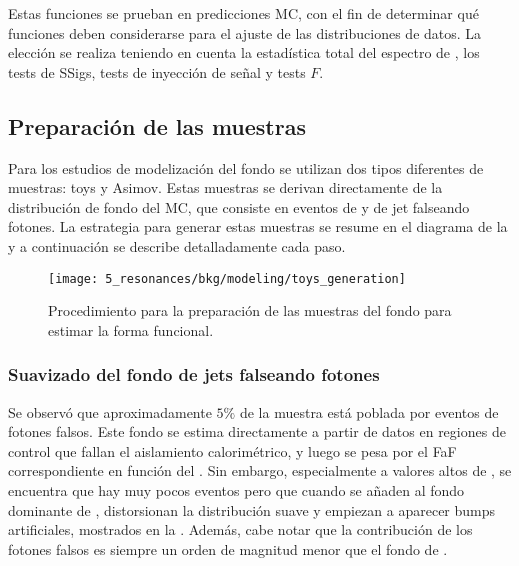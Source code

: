 Estas funciones se prueban en predicciones \ac{MC}, con el fin de determinar qué funciones deben considerarse para el ajuste de las distribuciones de datos.
La elección se realiza teniendo en cuenta la estadística total del espectro de \myj, los tests de \acp{SSig}, tests de inyección de señal y tests \(F\).










\subsection{Preparación de las muestras}
\label{subsec:bkg:modeling:preparation}

Para los estudios de modelización del fondo se utilizan dos tipos diferentes de muestras: toys y Asimov. Estas muestras se derivan directamente de la distribución de fondo del \ac{MC}, que consiste en eventos de \gammajet y de jet falseando fotones. La estrategia para generar estas muestras se resume en el diagrama de la \Fig{\ref{fig:bkg:modeling:preparation:datasets_generation}} y a continuación se describe detalladamente cada paso.

\begin{figure}[ht!]
    \centering
    \texttt{[image: 5\_resonances/bkg/modeling/toys\_generation]}
    \caption{Procedimiento para la preparación de las muestras del fondo para estimar la forma funcional.}
    \label{fig:bkg:modeling:preparation:datasets_generation}
\end{figure}




\subsubsection{Suavizado del fondo de jets falseando fotones}
\label{subsubsec:bkg:modeling:preparation:jfakes_smooth}


Se observó que aproximadamente \(5\%\) de la muestra \gammajet está poblada por eventos de fotones falsos. Este fondo se estima directamente a partir de datos en regiones de control que fallan el aislamiento calorimétrico, y luego se pesa por el \ac{FaF} correspondiente en función del \ptgam. Sin embargo, especialmente a valores altos de \myj, se encuentra que hay muy pocos eventos pero que cuando se añaden al fondo dominante de \gammajet, distorsionan la distribución suave y empiezan a aparecer bumps artificiales, mostrados en la \Fig{\ref{fig:bkg:modeling:preparation:jfakes_smooth:bkg_myj_distribution}}.
Además, cabe notar que la contribución de los fotones falsos es siempre un orden de magnitud menor que el fondo de \gammajet.

